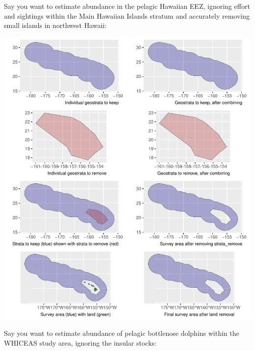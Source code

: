 \documentclass[
]{book}
\newenvironment{Shaded}{\begin{snugshade}}{\end{snugshade}}
\newcommand{\AttributeTok}[1]{\textcolor[rgb]{0.13,0.29,0.53}{#1}}
\newcommand{\ConstantTok}[1]{\textcolor[rgb]{0.56,0.35,0.01}{#1}}
\newcommand{\FunctionTok}[1]{\textcolor[rgb]{0.13,0.29,0.53}{\textbf{#1}}}
\newcommand{\NormalTok}[1]{#1}
\newcommand{\OtherTok}[1]{\textcolor[rgb]{0.56,0.35,0.01}{#1}}
\newcommand{\SpecialCharTok}[1]{\textcolor[rgb]{0.81,0.36,0.00}{\textbf{#1}}}
\newcommand{\StringTok}[1]{\textcolor[rgb]{0.31,0.60,0.02}{#1}}
\begin{document}
Say you want to estimate abundance in the pelagic Hawaiian EEZ, ignoring effort and sightings within the Main Hawaiian Islands stratum and accurately removing small islands in northwest Hawaii:

\begin{Shaded}
\end{Shaded}

\includegraphics{figures/unnamed-chunk-254-1.pdf}

Say you want to estimate abundance of pelagic bottlenose dolphins within the WHICEAS study area, ignoring the insular stocks:
\end{document}
